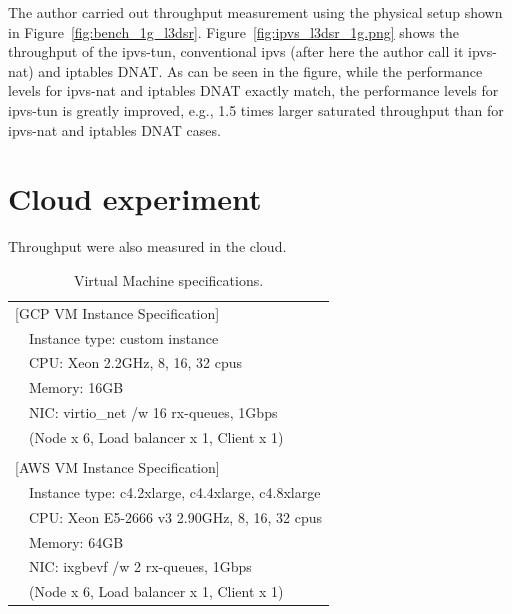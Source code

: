 The author carried out throughput measurement using the physical setup shown in Figure~\ref{fig:bench_1g_l3dsr}.
Figure~\ref{fig:ipvs_l3dsr_1g.png} shows the throughput of the ipvs-tun, conventional ipvs (after here the author call it ipvs-nat) and iptables DNAT.
As can be seen in the figure, while the performance levels for ipvs-nat and iptables DNAT exactly match, the performance levels for ipvs-tun is greatly improved, e.g., 1.5 times larger saturated throughput than for ipvs-nat and iptables DNAT cases.

\FloatBarrier

\section{Cloud experiment}

Throughput were also measured in the cloud.

{
\setlength{\tabcolsep}{3em}
\renewcommand{\arraystretch}{1.1}

\begin{table}[h]
  \centering
  \begin{tabular}{ll}
    \hline 
    \multicolumn{2}{l}{[GCP VM Instance Specification]}   \\
    & Instance type: custom instance \\
    & CPU: Xeon 2.2GHz, 8, 16, 32 cpus \hspace{2cm} \\
    & Memory: 16GB \\
    & NIC: virtio\_net /w 16 rx-queues, 1Gbps \\
    & (Node x 6, Load balancer x 1, Client x 1) \\
    & \\
    \multicolumn{2}{l}{[AWS VM Instance Specification]}   \\
    & Instance type: c4.2xlarge, c4.4xlarge, c4.8xlarge  \\
    & CPU: Xeon E5-2666 v3 2.90GHz, 8, 16, 32 cpus \\
    & Memory: 64GB \\
    & NIC: ixgbevf /w 2 rx-queues, 1Gbps \\
    & (Node x 6, Load balancer x 1, Client x 1) \\
    \hline
  \end{tabular}
  \caption[Virtual Machine specifications]{Virtual Machine specifications.}
  \label{fig:cloud_machine_spec}
\end{table}
}

